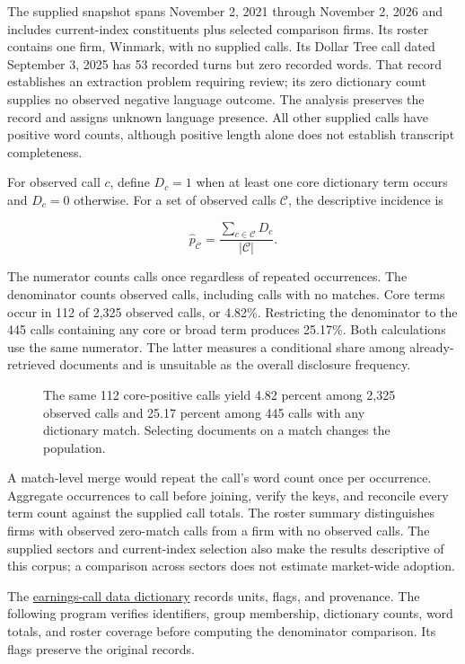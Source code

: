 The supplied snapshot spans November 2, 2021 through November 2, 2026
and includes current-index constituents plus selected comparison firms.
Its roster contains one firm, Winmark, with no supplied calls. Its
Dollar Tree call dated September 3, 2025 has 53 recorded turns but zero
recorded words. That record establishes an extraction problem requiring
review; its zero dictionary count supplies no observed negative language
outcome. The analysis preserves the record and assigns unknown language
presence. All other supplied calls have positive word counts, although
positive length alone does not establish transcript completeness.

For observed call \(c\), define \(D_c=1\) when at least one core
dictionary term occurs and \(D_c=0\) otherwise. For a set of observed
calls \(\mathcal C\), the descriptive incidence is

\[
\widehat p_{\mathcal C}=\frac{\sum_{c\in\mathcal C}D_c}{|\mathcal C|}.
\]

The numerator counts calls once regardless of repeated occurrences. The
denominator counts observed calls, including calls with no matches. Core
terms occur in 112 of 2,325 observed calls, or 4.82\%. Restricting the
denominator to the 445 calls containing any core or broad term produces
25.17\%. Both calculations use the same numerator. The latter measures a
conditional share among already-retrieved documents and is unsuitable as
the overall disclosure frequency.

\begin{figure}[htbp]
\centering

\caption{The same 112 core-positive calls yield 4.82 percent among 2,325 observed calls and 25.17 percent among 445 calls with any dictionary match. Selecting documents on a match changes the population.}\label{fig:M02_calls_denominator}
\end{figure}

A match-level merge would repeat the call's word count once per
occurrence. Aggregate occurrences to call before joining, verify the
keys, and reconcile every term count against the supplied call totals.
The roster summary distinguishes firms with observed zero-match calls
from a firm with no observed calls. The supplied sectors and
current-index selection also make the results descriptive of this
corpus; a comparison across sectors does not estimate market-wide
adoption.

The
\href{../03_Data_and_Code/Earnings_Calls/DATA_DICTIONARY.md}{earnings-call
data dictionary} records units, flags, and provenance. The following
program verifies identifiers, group membership, dictionary counts, word
totals, and roster coverage before computing the denominator comparison.
Its flags preserve the original records.

